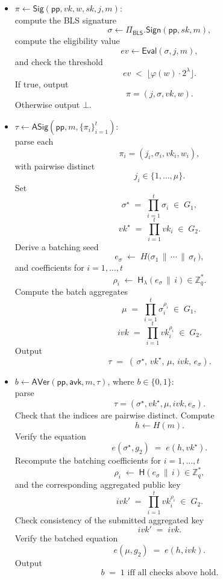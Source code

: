 \documentclass{article}
\begin{document}
\begin{itemize}
  \item $\pi \leftarrow \mathsf{Sig}(\mathsf{pp}, vk, w, sk, j, m)$:\\
        compute the BLS signature
        \[
          \sigma \leftarrow \Pi_{\mathsf{BLS}}.\mathsf{Sign}(\mathsf{pp}, sk, m),
        \]
        compute the eligibility value
        \[
          ev \leftarrow \mathsf{Eval}(\sigma, j, m),
        \]
        and check the threshold
        \[
          ev \;<\; \bigl\lfloor \varphi(w) \cdot 2^\lambda \bigr\rfloor.
        \]
        If true, output
        \[
          \pi=(j, \sigma, vk, w).
        \]
        Otherwise output $\bot$.




          \item $\tau \leftarrow \mathsf{ASig}(\mathsf{pp}, m, \{\pi_i\}_{i=1}^{t})$:\\
        parse each
        \[
          \pi_i=(j_i,\sigma_i,vk_i,w_i),
        \]
        with pairwise distinct
        \[
          j_i \in \{1,\dots,\mu\}.
        \]
        Set
        \[
          \sigma^\star \;=\; \prod_{i=1}^{t} \sigma_i \;\in\; G_1,
        \]
        \[
          vk^\star \;=\; \prod_{i=1}^{t} vk_i \;\in\; G_2.
        \]
        Derive a batching seed
        \[
          e_\sigma \;\leftarrow\; H\!\bigl(\sigma_1 \,\|\, \cdots \,\|\, \sigma_t \,\bigr),
        \]
        and coefficients for $i=1,\dots,t$
        \[
          \rho_i \;\leftarrow\; \mathsf{H_\lambda}(e_\sigma \,\|\, i) \in \mathbb{Z}_q^\ast.
        \]
        Compute the batch aggregates
        \[
          \mu \;=\; \prod_{i=1}^{t} \sigma_i^{\rho_i} \;\in\; G_1,
        \]
        \[
          ivk \;=\; \prod_{i=1}^{t} vk_i^{\rho_i} \;\in\; G_2.
        \]
        Output
        \[
          \tau \;=\; (\,\sigma^\star,\, vk^\star,\, \mu,\, ivk,\, e_\sigma).
        \]

  \item $b \leftarrow \mathsf{AVer}(\mathsf{pp}, \mathsf{avk}, m, \tau)$, where $b\in\{0,1\}$:\\
        parse
        \[
          \tau=(\sigma^\star, vk^\star, \mu, ivk, e_\sigma).
        \]
        Check that the indices are pairwise distinct.
        Compute
        \[
          h \leftarrow H(m).
        \]
        Verify the equation
        \[
          e(\sigma^\star, g_2) \;=\; e(h, vk^\star).
        \]
        Recompute the batching coefficients for $i=1,\dots,t$
        \[
          \rho_i \;\leftarrow\; \mathsf{H}(e_\sigma \,\|\, i) \in \mathbb{Z}_q^\ast,
        \]
        and the corresponding aggregated public key
        \[
          ivk' \;=\; \prod_{i=1}^{t} vk_i^{\rho_i} \;\in\; G_2.
        \]
        Check consistency of the submitted aggregated key
        \[
          ivk' \;=\; ivk.
        \]
        Verify the batched equation
        \[
          e(\mu, g_2) \;=\; e(h, ivk).
        \]
        Output
        \[
          b \;=\; 1 \text{ iff all checks above hold.}
        \]
\end{itemize}
\end{document}
